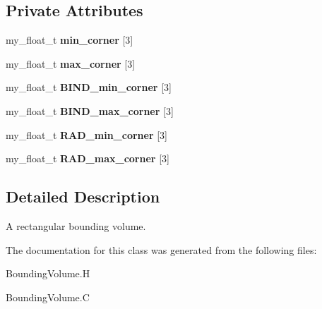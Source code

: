 \subsection*{Private Attributes}
\begin{CompactItemize}
\item 
my\_\-float\_\-t \textbf{min\_\-corner} [3]\label{classASCbase_1_1RectangularSolid_a57a2744d2006581f35568bd2e43ea58}

\item 
my\_\-float\_\-t \textbf{max\_\-corner} [3]\label{classASCbase_1_1RectangularSolid_6d297afcc473c3cc2336c3017e7f638a}

\item 
my\_\-float\_\-t \textbf{BIND\_\-min\_\-corner} [3]\label{classASCbase_1_1RectangularSolid_fdbc647071b0beff1c695f5919eecf14}

\item 
my\_\-float\_\-t \textbf{BIND\_\-max\_\-corner} [3]\label{classASCbase_1_1RectangularSolid_bd9eb2d180cd46f6325a483d809c17f5}

\item 
my\_\-float\_\-t \textbf{RAD\_\-min\_\-corner} [3]\label{classASCbase_1_1RectangularSolid_f06af8b6554856ea2fb19d943c1a5b3b}

\item 
my\_\-float\_\-t \textbf{RAD\_\-max\_\-corner} [3]\label{classASCbase_1_1RectangularSolid_463d6a3ed40fa149db9cdccd456cd075}

\end{CompactItemize}


\subsection{Detailed Description}
A rectangular bounding volume. 



The documentation for this class was generated from the following files:\begin{CompactItemize}
\item 
Bounding\-Volume.H\item 
Bounding\-Volume.C\end{CompactItemize}
